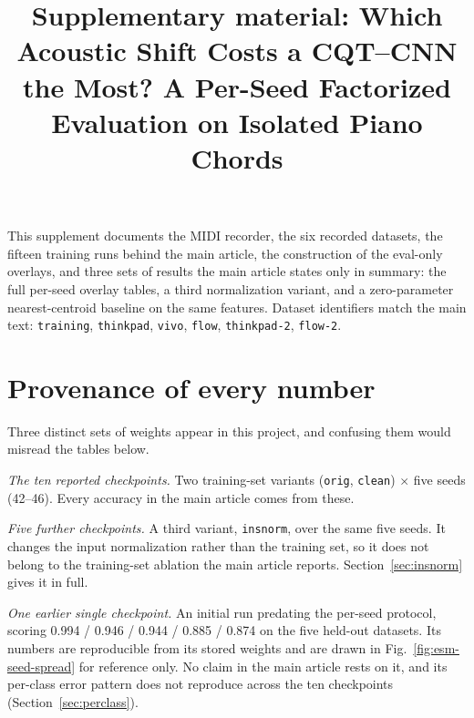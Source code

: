 \documentclass[pdflatex,sn-mathphys-num]{sn-jnl}
\begin{document}
\title[Supplementary material: Which acoustic shift costs a CQT--CNN the most]{Supplementary material: Which Acoustic Shift Costs a CQT--CNN the Most? A Per-Seed Factorized Evaluation on Isolated Piano Chords}

\author*[1]{ }
\author[1]{ }

\maketitle

This supplement documents the MIDI recorder, the six recorded datasets, the fifteen training runs behind the main article, the construction of the eval-only overlays, and three sets of results the main article states only in summary: the full per-seed overlay tables, a third normalization variant, and a zero-parameter nearest-centroid baseline on the same features. Dataset identifiers match the main text: \texttt{training}, \texttt{thinkpad}, \texttt{vivo}, \texttt{flow}, \texttt{thinkpad-2}, \texttt{flow-2}.

\section{Provenance of every number}\label{sec:provenance}

Three distinct sets of weights appear in this project, and confusing them would misread the tables below.

\emph{The ten reported checkpoints.} Two training-set variants (\texttt{orig}, \texttt{clean}) $\times$ five seeds (42--46). Every accuracy in the main article comes from these.

\emph{Five further checkpoints.} A third variant, \texttt{insnorm}, over the same five seeds. It changes the input normalization rather than the training set, so it does not belong to the training-set ablation the main article reports. Section~\ref{sec:insnorm} gives it in full.

\emph{One earlier single checkpoint.} An initial run predating the per-seed protocol, scoring 0.994 / 0.946 / 0.944 / 0.885 / 0.874 on the five held-out datasets. Its numbers are reproducible from its stored weights and are drawn in Fig.~\ref{fig:esm-seed-spread} for reference only. No claim in the main article rests on it, and its per-class error pattern does not reproduce across the ten checkpoints (Section~\ref{sec:perclass}).
\end{document}
